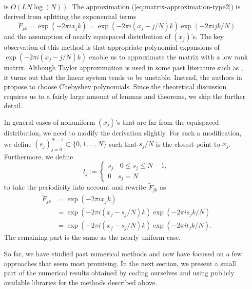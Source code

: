 is $O(L N \log(N))$.
The approximation (\ref{eq:matrix-approximation-type2}) is derived from splitting the exponential terms 
\begin{equation}
    \tilde{F}_{jk} = \exp(-2\pi i x_j k) 
  = \exp(-2\pi i (x_j - j/N)k)\exp(-2\pi i jk/N)
\end{equation}
and the assumption of nearly equispaced distribution of $(x_j)$'s.
The key observation of this method is that appropriate polynomial expansions of $\exp(-2\pi i (x_j - j/N)k)$ enable us to approximate the matrix with a low rank matrix.
Although Taylor approximation is used in some past literature such as \cite{SISC-1996-Anderson},
it turns out that the linear system tends to be unstable.
Instead, the authors in \cite{SISC-2018-Townsend} propose to choose Chebyshev polynomials.
Since the theoretical discussion requires us to a fairly large amount of lemmas and theorems, we skip the further detail.

In general cases of nonuniform $(x_j)$'s that are far from the equispaced distribution,
we need to modify the derivation slightly.
For such a modification, we define $(s_{j})_{j=0}^{N-1} \subset \{0, 1, \dots, N\}$ such that
$s_{j}/N$ is the closest point to $x_{j}$.
Furthermore, we define 
\begin{equation}
  t_{j} := 
  \begin{cases}
    s_{j} \quad 0 \le s_{j} \le N-1, \\
    0     \quad s_{j} = N
  \end{cases}
\end{equation}
to take the periodicity into account and rewrite $\tilde{F}_{jk}$ as 
\begin{align}
     \tilde{F}_{jk} 
  &= \exp(-2\pi i x_j k) \\
  &= \exp(-2\pi i (x_j - s_{j}/N)k)\exp(-2\pi i s_{j}k/N) \\
  &= \exp(-2\pi i (x_j - s_{j}/N)k)\exp(-2\pi i t_{j}k/N).
\end{align}
The remaining part is the same as the nearly uniform case.

So far, we have studied past numerical methods and now have focused on a few approaches that seem most promising.
In the next section, we present a small part of the numerical results obtained by coding ourselves and using publicly available libraries for the methods described above.

